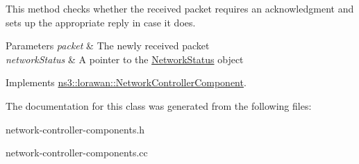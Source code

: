 This method checks whether the received packet requires an acknowledgment and sets up the appropriate reply in case it does.


\begin{DoxyParams}{Parameters}
{\em packet} & The newly received packet \\
\hline
{\em network\+Status} & A pointer to the \hyperlink{classns3_1_1lorawan_1_1NetworkStatus}{Network\+Status} object \\
\hline
\end{DoxyParams}


Implements \hyperlink{classns3_1_1lorawan_1_1NetworkControllerComponent_a965fb667c3e88703e8cdbcbcd057db6f}{ns3\+::lorawan\+::\+Network\+Controller\+Component}.



The documentation for this class was generated from the following files\+:\begin{DoxyCompactItemize}
\item 
network-\/controller-\/components.\+h\item 
network-\/controller-\/components.\+cc\end{DoxyCompactItemize}
